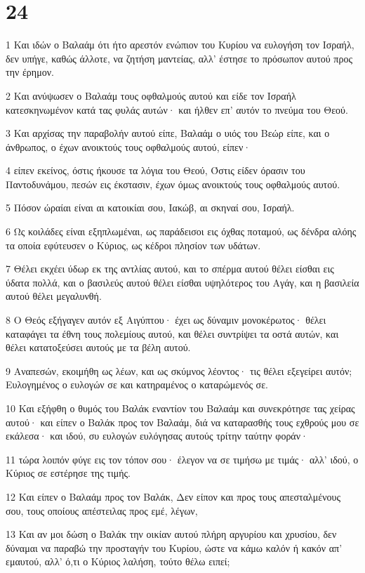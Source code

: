 \chapter{24}

\par 1 Και ιδών ο Βαλαάμ ότι ήτο αρεστόν ενώπιον του Κυρίου να ευλογήση τον Ισραήλ, δεν υπήγε, καθώς άλλοτε, να ζητήση μαντείας, αλλ' έστησε το πρόσωπον αυτού προς την έρημον.
\par 2 Και ανύψωσεν ο Βαλαάμ τους οφθαλμούς αυτού και είδε τον Ισραήλ κατεσκηνωμένον κατά τας φυλάς αυτών· και ήλθεν επ' αυτόν το πνεύμα του Θεού.
\par 3 Και αρχίσας την παραβολήν αυτού είπε, Βαλαάμ ο υιός του Βεώρ είπε, και ο άνθρωπος, ο έχων ανοικτούς τους οφθαλμούς αυτού, είπεν·
\par 4 είπεν εκείνος, όστις ήκουσε τα λόγια του Θεού, Όστις είδεν όρασιν του Παντοδυνάμου, πεσών εις έκστασιν, έχων όμως ανοικτούς τους οφθαλμούς αυτού.
\par 5 Πόσον ώραίαι είναι αι κατοικίαι σου, Ιακώβ, αι σκηναί σου, Ισραήλ.
\par 6 Ως κοιλάδες είναι εξηπλωμέναι, ως παράδεισοι εις όχθας ποταμού, ως δένδρα αλόης τα οποία εφύτευσεν ο Κύριος, ως κέδροι πλησίον των υδάτων.
\par 7 Θέλει εκχέει ύδωρ εκ της αντλίας αυτού, και το σπέρμα αυτού θέλει είσθαι εις ύδατα πολλά, και ο βασιλεύς αυτού θέλει είσθαι υψηλότερος του Αγάγ, και η βασιλεία αυτού θέλει μεγαλυνθή.
\par 8 Ο Θεός εξήγαγεν αυτόν εξ Αιγύπτου· έχει ως δύναμιν μονοκέρωτος· θέλει καταφάγει τα έθνη τους πολεμίους αυτού, και θέλει συντρίψει τα οστά αυτών, και θέλει κατατοξεύσει αυτούς με τα βέλη αυτού.
\par 9 Αναπεσών, εκοιμήθη ως λέων, και ως σκύμνος λέοντος· τις θέλει εξεγείρει αυτόν; Ευλογημένος ο ευλογών σε και κατηραμένος ο καταρώμενός σε.
\par 10 Και εξήφθη ο θυμός του Βαλάκ εναντίον του Βαλαάμ και συνεκρότησε τας χείρας αυτού· και είπεν ο Βαλάκ προς τον Βαλαάμ, διά να καταρασθής τους εχθρούς μου σε εκάλεσα· και ιδού, συ ευλογών ευλόγησας αυτούς τρίτην ταύτην φοράν·
\par 11 τώρα λοιπόν φύγε εις τον τόπον σου· έλεγον να σε τιμήσω με τιμάς· αλλ' ιδού, ο Κύριος σε εστέρησε της τιμής.
\par 12 Και είπεν ο Βαλαάμ προς τον Βαλάκ, Δεν είπον και προς τους απεσταλμένους σου, τους οποίους απέστειλας προς εμέ, λέγων,
\par 13 Και αν μοι δώση ο Βαλάκ την οικίαν αυτού πλήρη αργυρίου και χρυσίου, δεν δύναμαι να παραβώ την προσταγήν του Κυρίου, ώστε να κάμω καλόν ή κακόν απ' εμαυτού, αλλ' ό,τι ο Κύριος λαλήση, τούτο θέλω ειπεί;
